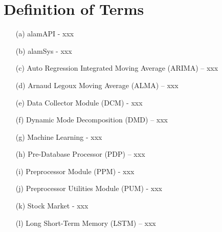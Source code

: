 \section{Definition of Terms}
\label{sec:def_terms}
\begin{itemize}
    \item[(a)] alamAPI - xxx
    \item[(b)] alamSys - xxx
    \item[(c)] Auto Regression Integrated Moving Average (ARIMA) – xxx
    \item[(d)] Arnaud Legoux Moving Average (ALMA) – xxx
    \item[(e)] Data Collector Module (DCM) - xxx
    \item[(f)] Dynamic Mode Decomposition (DMD) – xxx
    \item[(g)] Machine Learning - xxx
    \item[(h)] Pre-Database Processor (PDP) – xxx
    \item[(i)] Preprocessor Module (PPM) - xxx
    \item[(j)] Preprocessor Utilities Module (PUM) - xxx
    \item[(k)] Stock Market - xxx
    \item[(l)] Long Short-Term Memory (LSTM) – xxx 
\end{itemize}